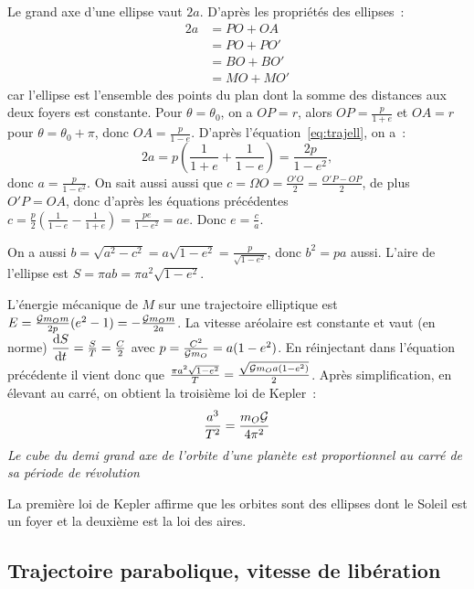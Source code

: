 Le grand axe d'une ellipse vaut \(2a\). D'après les propriétés des ellipses~:
\begin{equation}\label{eq:trajell}%
\begin{split}%
  2a & = PO + OA \\
  & = PO + PO' \\
  & = BO + BO' \\
  & = MO + MO'
\end{split}%
\end{equation}%
car l'ellipse est l'ensemble des points du plan dont la somme des distances aux
deux foyers est constante.
Pour \(\theta = \theta_0\), on a \(OP=r\), alors \(OP = \frac{p}{1+e}\) et \(OA
= r\) pour \(\theta = \theta_0 + \pi\), donc \(OA = \frac{p}{1-e}\).
D'après l'équation~\eqref{eq:trajell}, on a~:
\[2a = p\left(\frac{1}{1+e} + \frac{1}{1-e}\right) = \frac{2p}{1-e^2},\]
donc \(a = \frac{p}{1-e^2}\).
On sait aussi aussi que \(c = \Omega O = \frac{O'O}{2} = \frac{O'P - OP}{2}\),
de plus \(O'P = OA\), donc d'après les équations précédentes \(c=
\frac{p}{2}\left(\frac{1}{1-e} - \frac{1}{1+e}\right) = \frac{pe}{1-e^2} = %
ae\). Donc \(e = \frac{c}{a}\).

On a aussi \(b = \sqrt{a^2 - c^2} = a\sqrt{1-e^2} = \frac{p}{\sqrt{1-e^2}}\),
donc \(b^2 = pa\) aussi. L'aire de l'ellipse est \(S = \pi ab = \pi
a^2\sqrt{1-e^2}\).

L'énergie mécanique de \(M\) sur une trajectoire elliptique est \(E = \frac{\mathcal{G}
m_O m}{2p}(e^2-1) = -\frac{\mathcal{G} m_O m}{2a}\). La vitesse aréolaire est constante
et vaut (en norme) \(\dfrac{\mathrm{d} S}{\mathrm{d} t} = \frac{S}{T} = \frac{C}{2}\) avec \(p =
\frac{C^2}{\mathcal{G} m_O} = a(1-e^2)\). En réinjectant dans l'équation précédente il
%
vient donc que \(\frac{\pi a^2\sqrt{1-e^2}}{T} = \frac{\sqrt{\mathcal{G} m_O
a(1-e^2)}}{2}\). Après simplification, en élevant au carré, on obtient la
troisième loi de Kepler~:
\begin{equation}\label{eq:troisieme-loi-kepler}%
  \frac{a^3}{T^2} = \frac{m_O \Gb}{4\pi^2}
\end{equation}%
\emph{Le cube du demi grand axe de l'orbite d'une planète est proportionnel au
carré de sa période de révolution}

La première loi de Kepler affirme que les orbites sont des ellipses dont le
Soleil est un foyer et la deuxième est la loi des aires.

\subsection{Trajectoire parabolique, vitesse de libération}%

